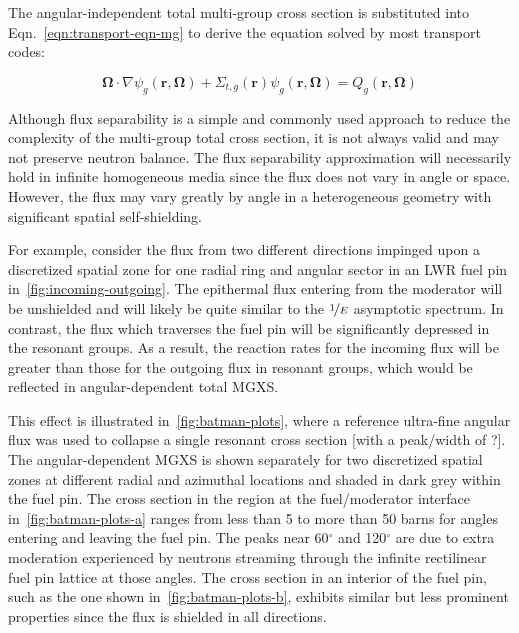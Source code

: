 \noindent The angular-independent total multi-group cross section is substituted into Eqn.~\ref{eqn:transport-eqn-mg} to derive the equation solved by most transport codes:

\begin{dmath}
\label{eqn:transport-eqn-mg-separate}
\mathbf{\Omega} \cdot \nabla \psi_{g}(\mathbf{r},\mathbf{\Omega}) + \Sigma_{t,g}(\mathbf{r})\psi_{g}(\mathbf{r},\mathbf{\Omega}) = Q_{g}(\mathbf{r},\mathbf{\Omega})
\end{dmath}

Although flux separability is a simple and commonly used approach to reduce the complexity of the multi-group total cross section, it is not always valid and may not preserve neutron balance. The flux separability approximation will necessarily hold in infinite homogeneous media since the flux does not vary in angle or space. However, the flux may vary greatly by angle in a heterogeneous geometry with significant spatial self-shielding.

For example, consider the flux from two different directions impinged upon a discretized spatial zone for one radial ring and angular sector in an LWR fuel pin in~\autoref{fig:incoming-outgoing}. The epithermal flux entering from the moderator will be unshielded and will likely be quite similar to the $\nicefrac{1}{E}$ asymptotic spectrum. In contrast, the flux which traverses the fuel pin will be significantly depressed in the resonant groups. As a result, the reaction rates for the incoming flux will be greater than those for the outgoing flux in resonant groups, which would be reflected in angular-dependent total MGXS.

This effect is illustrated in~\autoref{fig:batman-plots}, where a reference ultra-fine angular flux was used to collapse a single resonant cross section {\color{red}[with a peak/width of ?]}. The angular-dependent MGXS is shown separately for two discretized spatial zones at different radial and azimuthal locations and shaded in dark grey within the fuel pin. The cross section in the region at the fuel/moderator interface in~\autoref{fig:batman-plots-a} ranges from less than 5 to more than 50 barns for angles entering and leaving the fuel pin. The peaks near 60$^{\circ}$ and 120$^{\circ}$ are due to extra moderation experienced by neutrons streaming through the infinite rectilinear fuel pin lattice at those angles. The cross section in an interior of the fuel pin, such as the one shown in~\autoref{fig:batman-plots-b}, exhibits similar but less prominent properties since the flux is shielded in all directions.

